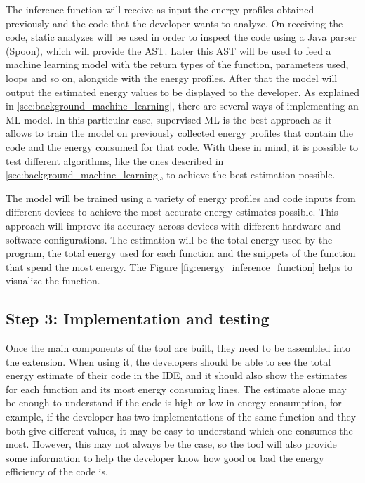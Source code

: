 \documentclass[sigplan]{acmart}
\begin{document}
The inference function will receive as input the energy profiles obtained previously and the code that the developer wants to analyze. On receiving the code, static analyzes will be used in order to inspect the code using a Java parser (Spoon), which will provide the AST. Later this AST will be used to feed a machine learning model with the return types of the function, parameters used, loops and so on, alongside with the energy profiles. After that the model will output the estimated energy values to be displayed to the developer.
As explained in \ref{sec:background_machine_learning}, there are several ways of implementing an ML model. In this particular case, supervised ML is the best approach as it allows to train the model on previously collected energy profiles that contain the code and the energy consumed for that code. With these in mind, it is possible to test different algorithms, like the ones described in \ref{sec:background_machine_learning}, to achieve the best estimation possible.


The model will be trained using a variety of energy profiles and code inputs from different devices to achieve the most accurate energy estimates possible. This approach will improve its accuracy across devices with different hardware and software configurations.
The estimation will be the total energy used by the program, the total energy used for each function and the snippets of the function that spend the most energy.
The Figure \ref{fig:energy_inference_function} helps to visualize the function.

\subsection{Step 3: Implementation and testing} \label{sec:work_step3_implementation_and_testing}

Once the main components of the tool are built, they need to be assembled into the extension. When using it, the developers should be able to see the total energy estimate of their code in the IDE, and it should also show the estimates for each function and its most energy consuming lines.
The estimate alone may be enough to understand if the code is high or low in energy consumption, for example, if the developer has two implementations of the same function and they both give different values, it may be easy to understand which one consumes the most. However, this may not always be the case, so the tool will also provide some information to help the developer know how good or bad the energy efficiency of the code is.
\end{document}
